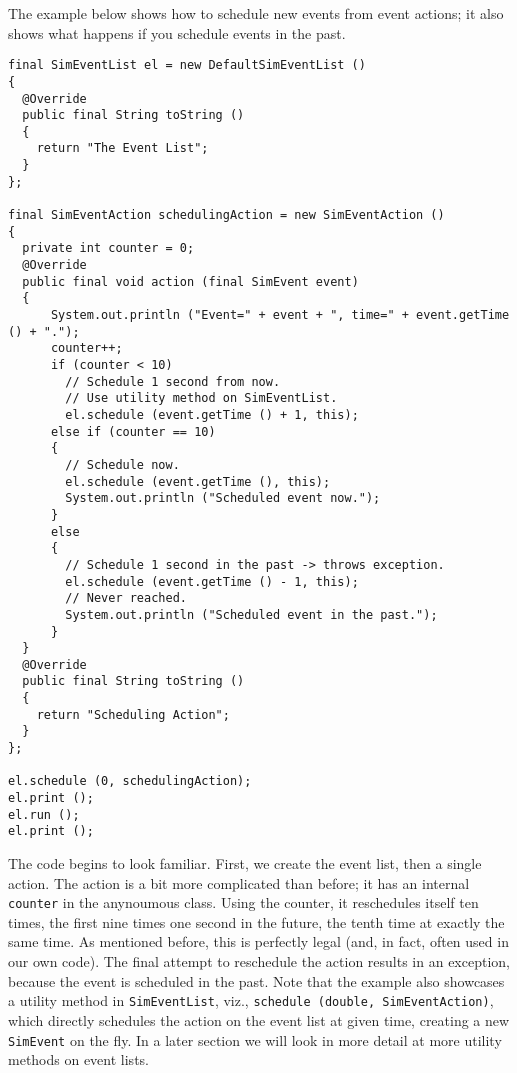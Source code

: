 The example below shows how to schedule new events
  from event actions; it also shows what happens if you schedule
  events in the past.
\begin{lstlisting}[basicstyle=\tiny]
final SimEventList el = new DefaultSimEventList ()
{
  @Override
  public final String toString ()
  {
    return "The Event List";
  } 
};

final SimEventAction schedulingAction = new SimEventAction ()
{
  private int counter = 0;
  @Override
  public final void action (final SimEvent event)
  {
      System.out.println ("Event=" + event + ", time=" + event.getTime () + ".");
      counter++;
      if (counter < 10)
        // Schedule 1 second from now.
        // Use utility method on SimEventList.
        el.schedule (event.getTime () + 1, this);
      else if (counter == 10)
      {
        // Schedule now.
        el.schedule (event.getTime (), this);
        System.out.println ("Scheduled event now.");
      }
      else
      {
        // Schedule 1 second in the past -> throws exception.
        el.schedule (event.getTime () - 1, this);
        // Never reached.
        System.out.println ("Scheduled event in the past.");
      }
  }
  @Override
  public final String toString ()
  {
    return "Scheduling Action";
  }
};
    
el.schedule (0, schedulingAction);
el.print ();
el.run ();
el.print ();
\end{lstlisting}
The code begins to look familiar.
First, we create the event list, then a single action.
The action is a bit more complicated than before;
  it has an internal \lstinline{counter} in the anynoumous class.
Using the counter, it reschedules itself ten times,
  the first nine times one second in the future,
  the tenth time at exactly the same time.
As mentioned before, this is perfectly legal
  (and, in fact, often used in our own code).
The final attempt to reschedule the action results in an
  exception, because the event is scheduled in the past.
Note that the example also showcases a utility method
  in \lstinline{SimEventList}, viz., \lstinline{schedule (double, SimEventAction)},
  which directly schedules the action on the event list at given time,
  creating a new \lstinline{SimEvent} on the fly.
In a later section we will look in more detail at more utility methods
  on event lists.

